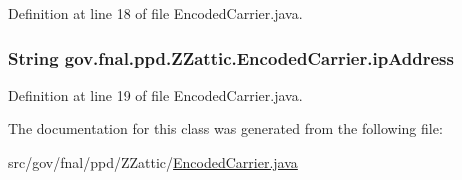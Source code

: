 Definition at line 18 of file Encoded\-Carrier.\-java.

\hypertarget{classgov_1_1fnal_1_1ppd_1_1ZZattic_1_1EncodedCarrier_a92ce35341bcff56215a1541d67eeb04a}{
\subsubsection[{ip\-Address}]{\setlength{\rightskip}{0pt plus 5cm}String gov.\-fnal.\-ppd.\-Z\-Zattic.\-Encoded\-Carrier.\-ip\-Address\hspace{0.3cm}{\ttfamily [protected]}}}\label{classgov_1_1fnal_1_1ppd_1_1ZZattic_1_1EncodedCarrier_a92ce35341bcff56215a1541d67eeb04a}


Definition at line 19 of file Encoded\-Carrier.\-java.



The documentation for this class was generated from the following file\-:\begin{DoxyCompactItemize}
\item 
src/gov/fnal/ppd/\-Z\-Zattic/\hyperlink{EncodedCarrier_8java}{Encoded\-Carrier.\-java}\end{DoxyCompactItemize}
